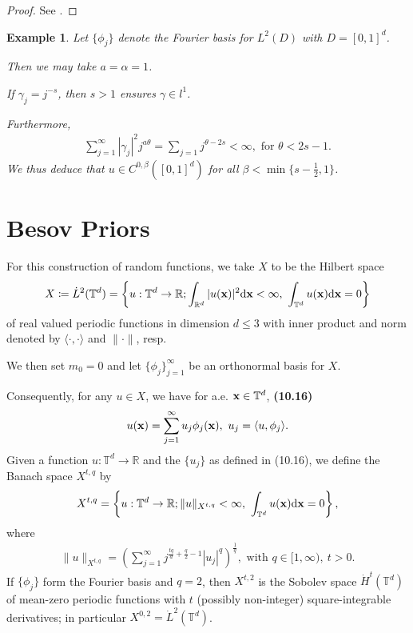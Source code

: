 \documentclass[oneside,11pt]{book}
\numberwithin{equation}{section}
\newtheorem{example}{Example}[section]
\begin{document}
\begin{proof}
    See \cite[p. 324]{Dashti_Stuart2017}.
\end{proof}

\begin{example}
    Let $\{\phi_j\}$ denote the Fourier basis for $L^2(D)$ with $D = [0,1]^d$.
    
    Then we may take $a = \alpha = 1$.
    
    If $\gamma_j = j^{-s}$, then $s > 1$ ensures $\gamma\in l^1$.
    
    Furthermore,
    \begin{align*}
        \sum_{j=1}^\infty |\gamma_j|^2j^{a\theta} = \sum_{j=1} j^{\theta - 2s} < \infty, \mbox{ for } \theta < 2s - 1.
    \end{align*}
    We thus deduce that $u\in C^{0,\beta}([0,1]^d)$ for all $\beta < \min\{s - \frac{1}{2},1\}$.
\end{example}

\section{Besov Priors}
For this construction of random functions, we take $X$ to be the Hilbert space
\begin{align*}
    X\coloneqq\dot{L}^2(\mathbb{T}^d) = \left\{u:\mathbb{T}^d\to\mathbb{R};\int_{\mathbb{R}^d} |u({\bf x})|^2{\rm d}{\bf x} < \infty,\ \int_{\mathbb{T}^d} u({\bf x}){\rm d}{\bf x} = 0\right\}
\end{align*}
of real valued periodic functions in dimension $d\le 3$ with inner product and norm denoted by $\langle\cdot,\cdot\rangle$ and $\|\cdot\|$, resp.

We then set $m_0 = 0$ and let $\{\phi_j\}_{j=1}^\infty$ be an orthonormal basis for $X$.

Consequently, for any $u\in X$, we have for a.e. ${\bf x}\in\mathbb{T}^d$, \textbf{(10.16)}
\begin{align*}
    u({\bf x}) = \sum_{j=1}^\infty u_j\phi_j({\bf x}),\ u_j = \langle u,\phi_j\rangle.
\end{align*}
Given a function $u:\mathbb{T}^d\to\mathbb{R}$ and the $\{u_j\}$ as defined in (10.16), we define the Banach space $X^{t,q}$ by
\begin{align*}
    X^{t,q} = \left\{u:\mathbb{T}^d\to\mathbb{R};\|u\|_{X^{t,q}} < \infty,\ \int_{\mathbb{T}^d} u({\bf x}){\rm d}{\bf x} = 0\right\},
\end{align*}
where
\begin{align*}
    \|u\|_{X^{t,q}} = \left(\sum_{j=1}^\infty j^{\frac{tq}{d} + \frac{q}{2} - 1}|u_j|^q\right)^{\frac{1}{q}}, \mbox{ with } q\in[1,\infty),\ t > 0.
\end{align*}
If $\{\phi_j\}$ form the Fourier basis and $q = 2$, then $X^{t,2}$ is the Sobolev space $\dot{H}^t(\mathbb{T}^d)$ of mean-zero periodic functions with $t$ (possibly non-integer) square-integrable derivatives; in particular $X^{0,2} = \dot{L}^2(\mathbb{T}^d)$.
\end{document}
